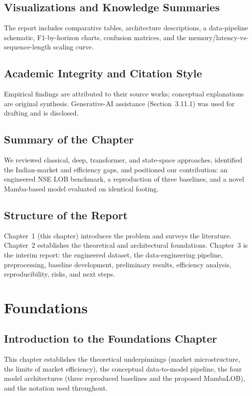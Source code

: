 \documentclass[11pt]{article}
\begin{document}
\subsection{Visualizations and Knowledge Summaries}
The report includes comparative tables, architecture descriptions, a data-pipeline schematic, F1-by-horizon
charts, confusion matrices, and the memory/latency-vs-sequence-length scaling curve.

\subsection{Academic Integrity and Citation Style}
Empirical findings are attributed to their source works; conceptual explanations are original synthesis.
Generative-AI assistance (Section~3.11.1) was used for drafting and is disclosed.

\subsection{Summary of the Chapter}
We reviewed classical, deep, transformer, and state-space approaches, identified the Indian-market and
efficiency gaps, and positioned our contribution: an engineered NSE LOB benchmark, a reproduction of three
baselines, and a novel Mamba-based model evaluated on identical footing.

\subsection{Structure of the Report}
Chapter~1 (this chapter) introduces the problem and surveys the literature. Chapter~2 establishes the
theoretical and architectural foundations. Chapter~3 is the interim report: the engineered dataset, the
data-engineering pipeline, preprocessing, baseline development, preliminary results, efficiency analysis,
reproducibility, risks, and next steps.

\section{Foundations}

\subsection{Introduction to the Foundations Chapter}
This chapter establishes the theoretical underpinnings (market microstructure, the limits of market
efficiency), the conceptual data-to-model pipeline, the four model architectures (three reproduced
baselines and the proposed MambaLOB), and the notation used throughout.
\end{document}
